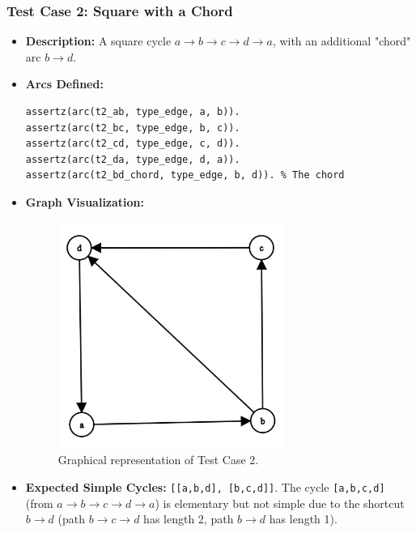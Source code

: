 \documentclass[12pt,a4paper]{article}
\begin{document}
\subsubsection{Test Case 2: Square with a Chord}
\begin{itemize}
\item \textbf{Description:} A square cycle $a \rightarrow b \rightarrow c \rightarrow d \rightarrow a$, with an additional "chord" arc $b \rightarrow d$. 
\item \textbf{Arcs Defined:}
\begin{lstlisting}[style=prologstyle, basicstyle=\ttfamily\footnotesize]
assertz(arc(t2_ab, type_edge, a, b)).
assertz(arc(t2_bc, type_edge, b, c)).
assertz(arc(t2_cd, type_edge, c, d)).
assertz(arc(t2_da, type_edge, d, a)).
assertz(arc(t2_bd_chord, type_edge, b, d)). % The chord
\end{lstlisting}
\item \textbf{Graph Visualization:}
\begin{figure}[H]
\centering
\includegraphics[width=0.7\textwidth]{img/Test2.png} %
\caption{Graphical representation of Test Case 2.}
\label{fig:testcase2}
\end{figure}
\item \textbf{Expected Simple Cycles:} \texttt{[[a,b,d], [b,c,d]]}. The cycle \texttt{[a,b,c,d]} (from $a \rightarrow b \rightarrow c \rightarrow d \rightarrow a$) is elementary but not simple due to the shortcut $b \rightarrow d$ (path $b \rightarrow c \rightarrow d$ has length 2, path $b \rightarrow d$ has length 1). 
\end{itemize}
\end{document}
